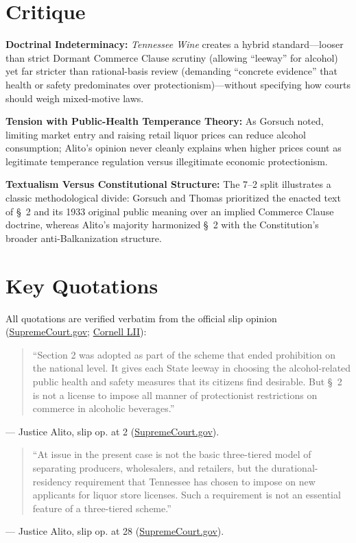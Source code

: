 \documentclass[12pt]{article}
\begin{document}
\section{Critique}
\textbf{Doctrinal Indeterminacy:} \textit{Tennessee Wine} creates a hybrid standard---looser than strict Dormant Commerce Clause scrutiny (allowing ``leeway'' for alcohol) yet far stricter than rational-basis review (demanding ``concrete evidence'' that health or safety predominates over protectionism)---without specifying how courts should weigh mixed-motive laws.

\textbf{Tension with Public-Health Temperance Theory:} As Gorsuch noted, limiting market entry and raising retail liquor prices can reduce alcohol consumption; Alito's opinion never cleanly explains when higher prices count as legitimate temperance regulation versus illegitimate economic protectionism.

\textbf{Textualism Versus Constitutional Structure:} The 7--2 split illustrates a classic methodological divide: Gorsuch and Thomas prioritized the enacted text of \S~2 and its 1933 original public meaning over an implied Commerce Clause doctrine, whereas Alito's majority harmonized \S~2 with the Constitution's broader anti-Balkanization structure.

\section{Key Quotations}
All quotations are verified verbatim from the official slip opinion (\href{https://www.supremecourt.gov/opinions/18pdf/18-96_5i36.pdf}{SupremeCourt.gov}; \href{https://www.law.cornell.edu/supremecourt/text/18-96}{Cornell LII}):

\begin{quote}
``Section 2 was adopted as part of the scheme that ended prohibition on the national level. It gives each State leeway in choosing the alcohol-related public health and safety measures that its citizens find desirable. But \S~2 is not a license to impose all manner of protectionist restrictions on commerce in alcoholic beverages.''
\end{quote}
\noindent --- Justice Alito, slip op. at 2 (\href{https://www.supremecourt.gov/opinions/18pdf/18-96_5i36.pdf}{SupremeCourt.gov}).

\begin{quote}
``At issue in the present case is not the basic three-tiered model of separating producers, wholesalers, and retailers, but the durational-residency requirement that Tennessee has chosen to impose on new applicants for liquor store licenses. Such a requirement is not an essential feature of a three-tiered scheme.''
\end{quote}
\noindent --- Justice Alito, slip op. at 28 (\href{https://www.supremecourt.gov/opinions/18pdf/18-96_5i36.pdf}{SupremeCourt.gov}).
\end{document}
